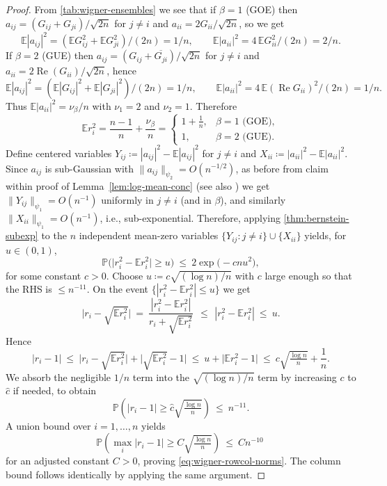 \documentclass[11pt,a4paper]{article}
\newcommand{\be}{\begin{equation}}
\newcommand{\ee}{\end{equation}}
\newcommand{\Prob}{\mathbb{P}}
\newcommand{\E}{\mathbb{E}}
\begin{document}
\begin{proof}
From \cref{tab:wigner-ensembles} we see that if $\beta=1$ (GOE) then $a_{ij}=(G_{ij}+G_{ji})/\sqrt{2n}$ for $j\neq i$ and $a_{ii}=2G_{ii}/\sqrt{2n}$, so we get
\be
\E|a_{ij}|^2=(\E G_{ij}^2+\E G_{ji}^2)/(2n)=1/n, \qquad \E|a_{ii}|^2=4\,\E G_{ii}^2/(2n)=2/n.
\ee
If $\beta=2$ (GUE) then $a_{ij}=(G_{ij}+\overline{G_{ji}})/\sqrt{2n}$ for $j\neq i$ and $a_{ii}=2\operatorname{Re}(G_{ii})/\sqrt{2n}$, hence
\be
\E|a_{ij}|^2=(\E|G_{ij}|^2+\E|G_{ji}|^2)/(2n)=1/n, \qquad
\E|a_{ii}|^2=4\,\E(\operatorname{Re}G_{ii})^2/(2n)=1/n.
\ee
Thus $\E|a_{ii}|^2=\nu_\beta/n$ with $\nu_1=2$ and $\nu_2=1$. Therefore
\begin{equation}\label{eq:vbeta-values}
\E r_i^2=\frac{n-1}{n}+\frac{\nu_\beta}{n}=
\begin{cases}
1+\frac{1}{n}, & \beta=1\text{ (GOE)},\\[2pt]
1, & \beta=2\text{ (GUE)}.
\end{cases}
\end{equation}
Define centered variables $Y_{ij}\coloneq |a_{ij}|^2-\E|a_{ij}|^2$ for $j\neq i$ and $X_{ii}\coloneq |a_{ii}|^2-\E|a_{ii}|^2$. Since $a_{ij}$ is sub-Gaussian with $\|a_{ij}\|_{\psi_2}=O(n^{-1/2})$, as before from claim within proof of Lemma~\ref{lem:log-mean-conc} (see also \cite{Vershynin2018HDP}) we get $\|Y_{ij}\|_{\psi_1}=O(n^{-1})$ uniformly in $j\neq i$ (and in $\beta$), and similarly $\|X_{ii}\|_{\psi_1}=O(n^{-1})$, i.e., sub-exponential. Therefore, applying \cref{thm:bernstein-subexp} to the $n$ independent mean-zero variables $\{Y_{ij}:j\neq i\}\cup\{X_{ii}\}$ yields, for $u\in(0,1)$,
\begin{equation}\label{eq:bernstein-sum}
\Prob\Big(\bigl|r_i^2-\E r_i^2\bigr|\geq u\Big)\ \le\ 2\exp\!\big(-c n u^2\big),
\end{equation}
for some constant $c>0$. Choose $u\coloneq c\sqrt{(\log n)/n}$ with $c$ large enough so that the RHS is $\le n^{-11}$. On the event $\{|r_i^2-\E r_i^2|\le u\}$ we get
\begin{equation}
\bigl|r_i-\sqrt{\E r_i^2}\bigr|\ =\ \frac{|r_i^2-\E r_i^2|}{r_i+\sqrt{\E r_i^2}}\ 
\ \le\ \,|r_i^2-\E r_i^2|\ \le\ u.
\end{equation}
Hence
\begin{equation}
|r_i-1| \ \le\ \bigl|r_i-\sqrt{\E r_i^2}\bigr|+\bigl|\sqrt{\E r_i^2}-1\bigr|
\ \le\ u + \bigl|\E r_i^2-1\bigr|
\ \le\ c\sqrt{\tfrac{\log n}{n}}+\frac{1}{n}.
\end{equation}
We absorb the negligible $1/n$ term into the $\sqrt{(\log n)/n}$ term by increasing $c$ to $\hat c$ if needed, to obtain
\begin{equation}
\Prob\!\left(|r_i-1|\geq \hat c\sqrt{\tfrac{\log n}{n}}\right)\ \le\ n^{-11}.
\end{equation}
A union bound over $i=1,\dots,n$ yields
\begin{equation}
\Prob\!\left(\max_i |r_i-1|\geq C\sqrt{\tfrac{\log n}{n}}\right)\ \le\ C n^{-10}\ 
\end{equation}
for an adjusted constant $C>0$, proving \cref{eq:wigner-rowcol-norms}. The column bound follows identically by applying the same argument.
\end{proof}
\end{document}
